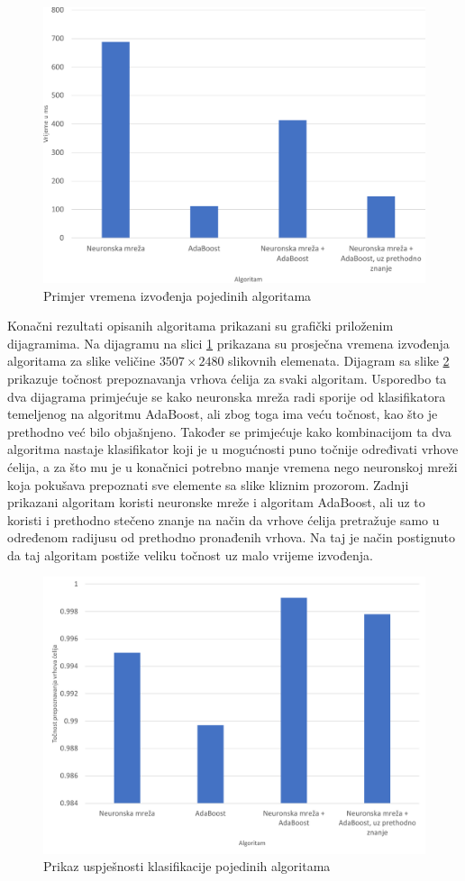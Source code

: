 \documentclass[times, utf8, zavrsni, numeric]{fer}
\begin{document}
\begin{figure}[ht!]
    \centering
    \includegraphics[width=.75\linewidth]{Images/TimeComparison}
    \captionsetup{justification=centering}
    \caption{Primjer vremena izvođenja pojedinih algoritama}
    \label{fig:compareTime}
\end{figure}

Konačni rezultati opisanih algoritama prikazani su grafički priloženim dijagramima.
Na dijagramu na slici \ref{fig:compareTime} prikazana su prosječna vremena izvođenja algoritama za slike veličine $3507\times2480$ slikovnih elemenata.
Dijagram sa slike \ref{fig:compareSuccess} prikazuje točnost prepoznavanja vrhova ćelija za svaki algoritam.
Usporedbo ta dva dijagrama primjećuje se kako neuronska mreža radi sporije od klasifikatora temeljenog na algoritmu AdaBoost, ali zbog toga ima veću točnost, kao što je prethodno već bilo objašnjeno.
Također se primjećuje kako kombinacijom ta dva algoritma nastaje klasifikator koji je u mogućnosti puno točnije određivati vrhove ćelija, a za što mu je u konačnici potrebno manje vremena nego neuronskoj mreži koja pokušava prepoznati sve elemente sa slike kliznim prozorom.
Zadnji prikazani algoritam koristi neuronske mreže i algoritam AdaBoost, ali uz to koristi i prethodno stečeno znanje na način da vrhove ćelija pretražuje samo u određenom radijusu od prethodno pronađenih vrhova.
Na taj je način postignuto da taj algoritam postiže veliku točnost uz malo vrijeme izvođenja.

\begin{figure}[ht!]
    \centering
    \includegraphics[width=.75\linewidth]{Images/SuccessComparison}
    \captionsetup{justification=centering}
    \caption{Prikaz uspješnosti klasifikacije pojedinih algoritama}
    \label{fig:compareSuccess}
\end{figure}
\end{document}
